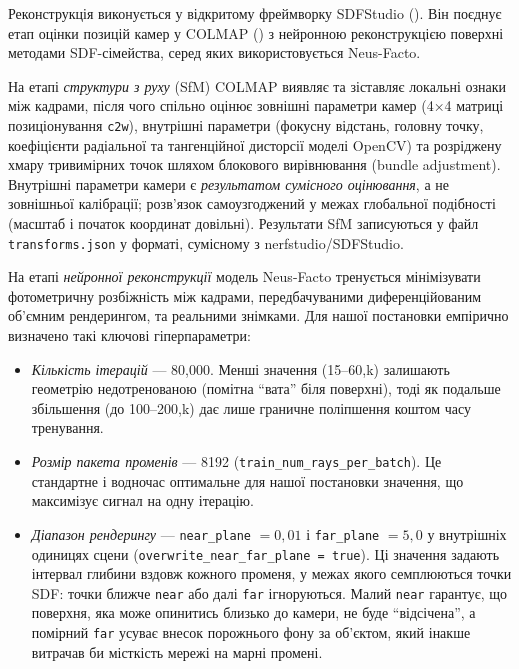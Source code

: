 \documentclass[
  ukrainian,
  10pt,
  a4paper,
  twocolumn]{article}
\providecommand{\tightlist}{%
  \setlength{\itemsep}{0pt}\setlength{\parskip}{0pt}}
\begin{document}
Реконструкція виконується у відкритому фреймворку SDFStudio
(). Він поєднує етап
оцінки позицій камер у COLMAP
() з
нейронною реконструкцією поверхні методами SDF-сімейства, серед яких
використовується Neus-Facto.

На етапі \emph{структури з руху} (SfM) COLMAP виявляє та зіставляє
локальні ознаки між кадрами, після чого спільно оцінює зовнішні
параметри камер (4×4 матриці позиціонування \texttt{c2w}), внутрішні
параметри (фокусну відстань, головну точку, коефіцієнти радіальної та
тангенційної дисторсії моделі OpenCV) та розріджену хмару тривимірних
точок шляхом блокового вирівнювання (bundle adjustment). Внутрішні
параметри камери є \emph{результатом сумісного оцінювання}, а не
зовнішньої калібрації; розв'язок самоузгоджений у межах глобальної
подібності (масштаб і початок координат довільні). Результати SfM
записуються у файл \texttt{transforms.json} у форматі, сумісному з
nerfstudio/SDFStudio.

На етапі \emph{нейронної реконструкції} модель Neus-Facto тренується
мінімізувати фотометричну розбіжність між кадрами, передбачуваними
диференційованим об'ємним рендерингом, та реальними знімками. Для нашої
постановки емпірично визначено такі ключові гіперпараметри:

\begin{itemize}
\tightlist
\item
  \emph{Кількість ітерацій} --- 80,000. Менші значення (15--60,k)
  залишають геометрію недотренованою (помітна ``вата'' біля поверхні),
  тоді як подальше збільшення (до 100--200,k) дає лише граничне
  поліпшення коштом часу тренування.
\item
  \emph{Розмір пакета променів} --- 8192
  (\texttt{train\_num\_rays\_per\_batch}). Це стандартне і водночас
  оптимальне для нашої постановки значення, що максимізує сигнал на одну
  ітерацію.
\item
  \emph{Діапазон рендерингу} --- \texttt{near\_plane} \(=0,01\) і
  \texttt{far\_plane} \(=5,0\) у внутрішніх одиницях сцени
  (\texttt{overwrite\_near\_far\_plane\ =\ true}). Ці значення задають
  інтервал глибини вздовж кожного променя, у межах якого семплюються
  точки SDF: точки ближче \texttt{near} або далі \texttt{far}
  ігноруються. Малий \texttt{near} гарантує, що поверхня, яка може
  опинитись близько до камери, не буде ``відсічена'', а помірний
  \texttt{far} усуває внесок порожнього фону за об'єктом, який інакше
  витрачав би місткість мережі на марні промені.
\end{itemize}
\end{document}
